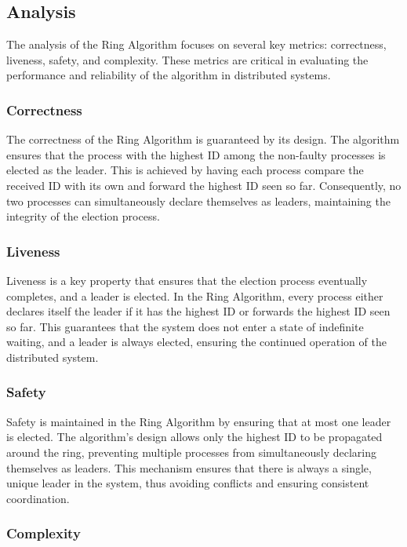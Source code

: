 \subsection{Analysis}
The analysis of the Ring Algorithm focuses on several key metrics: correctness, liveness, safety, and complexity. These metrics are critical in evaluating the performance and reliability of the algorithm in distributed systems.

\subsubsection{Correctness}

The correctness of the Ring Algorithm is guaranteed by its design. The algorithm ensures that the process with the highest ID among the non-faulty processes is elected as the leader. This is achieved by having each process compare the received ID with its own and forward the highest ID seen so far. Consequently, no two processes can simultaneously declare themselves as leaders, maintaining the integrity of the election process.

\subsubsection{Liveness}

Liveness is a key property that ensures that the election process eventually completes, and a leader is elected. In the Ring Algorithm, every process either declares itself the leader if it has the highest ID or forwards the highest ID seen so far. This guarantees that the system does not enter a state of indefinite waiting, and a leader is always elected, ensuring the continued operation of the distributed system.

\subsubsection{Safety}

Safety is maintained in the Ring Algorithm by ensuring that at most one leader is elected. The algorithm's design allows only the highest ID to be propagated around the ring, preventing multiple processes from simultaneously declaring themselves as leaders. This mechanism ensures that there is always a single, unique leader in the system, thus avoiding conflicts and ensuring consistent coordination.

\subsubsection{Complexity}

